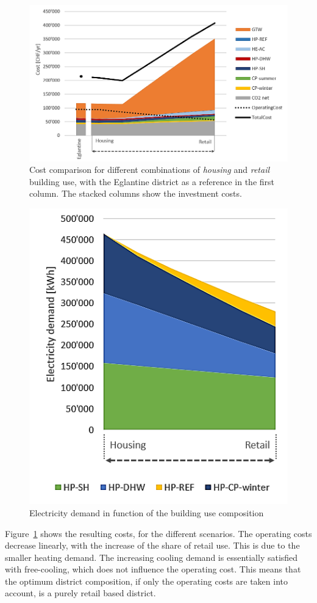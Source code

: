 \documentclass{article}
\begin{document}
\begin{figure}[htp]
	\centering
	\includegraphics[width=1\textwidth]{CU_SA_TC.png}
	\caption{Cost comparison for different combinations of \textit{housing} and \textit{retail} building use, with the Eglantine district as a reference in the first column. The stacked columns show the investment costs.}
	\label{fig:CU_TC}
\end{figure}

\begin{figure}[tph]
	\centering
	\includegraphics[width=0.55\linewidth]{Images/CU_el}
	\caption{Electricity demand in function of the building use composition}
	\label{fig:CU_el}
\end{figure}

Figure~\ref{fig:CU_TC} shows the resulting costs, for the different scenarios. The operating costs decrease linearly, with the increase of the share of retail use. This is due to the smaller heating demand. The increasing cooling demand is essentially satisfied with free-cooling, which does not influence the operating cost. This means that the optimum district composition, if only the operating costs are taken into account, is a purely retail based district.\\
\end{document}
